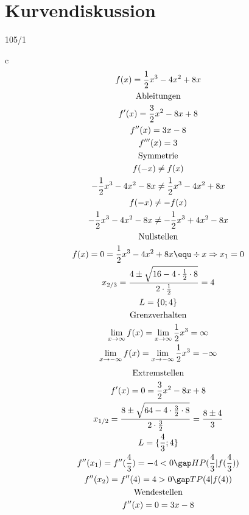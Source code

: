 \section{Kurvendiskussion}
\begin{exercise}{105/1}
  \item [c]
  \begin{gather*}
    f(x) = \frac{1}{2}x^3 - 4x^2 + 8x \\
    \text{Ableitungen} \\
    f'(x) = \frac{3}{2}x^2 - 8x + 8 \\
    f''(x) = 3x - 8 \\
    f'''(x) = 3 \\
    \text{Symmetrie} \\
    f(-x) \neq f(x) \\
    -\frac{1}{2}x^3 - 4x^2 - 8x \neq \frac{1}{2}x^3 - 4x^2 + 8x \\
    f(-x) \neq -f(x) \\
    -\frac{1}{2}x^3 - 4x^2 - 8x \neq -\frac{1}{2}x^3 + 4x^2 - 8x \\
    \text{Nullstellen} \\
    f(x) = 0 = \frac{1}{2}x^3 - 4x^2 + 8x \equ \div x \Rightarrow x_1 = 0 \\
    x_{2/3} = \frac{4 \pm \sqrt{16 - 4 \cdot \frac{1}{2} \cdot 8}}{2 \cdot \frac{1}{2}} = 4 \\
    L = \{0; 4\} \\
    \text{Grenzverhalten} \\
    \lim\limits_{x \to \infty} f(x) = \lim\limits_{x \to \infty} \frac{1}{2}x^3 = \infty \\
    \lim\limits_{x \to -\infty} f(x) = \lim\limits_{x \to -\infty} \frac{1}{2}x^3 = -\infty \\
  \end{gather*}
  \begin{gather*}
    \text{Extremstellen} \\
    f'(x) = 0 = \frac{3}{2}x^2 - 8x + 8 \\
    x_{1/2} = \frac{8 \pm \sqrt{64 - 4 \cdot \frac{3}{2} \cdot 8}}{2 \cdot \frac{3}{2}} = \frac{8 \pm 4}{3} \\
    L = \{\frac{4}{3}; 4\} \\
    f''(x_1) = f''(\frac{4}{3}) = -4 < 0 \gap HP(\frac{4}{3}|f(\frac{4}{3})) \\
    f''(x_2) = f''(4) = 4 > 0 \gap TP(4|f(4)) \\
    \text{Wendestellen} \\
    f''(x) = 0 = 3x - 8 \\

\end{gather*}
\end{exercise}
